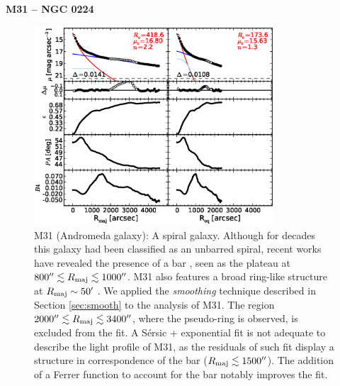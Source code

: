 \documentclass[preprint2]{emulateapj}
\newcommand{\fitfigurewidth}{0.8\textwidth}
\begin{document}
  \clearpage\newpage\noindent
  {\bf M31 -- NGC 0224 \\}

  \begin{figure}[h]
  \begin{center}
  \includegraphics[width=\fitfigurewidth]{m31_1Dfit.eps}
  \caption{M31 (Andromeda galaxy):
  A spiral galaxy. 
  Although for decades this galaxy had been classified as an unbarred spiral,
  recent works have revealed the presence of a bar \citep{athanassoulabeaton2006m31,beaton2007m31,morrison2011m31}, 
  seen as the plateau at $800'' \lesssim R_{\rm maj} \lesssim 1000''$.
  M31 also features a broad ring-like structure at $R_{\rm maj} \sim 50'$ \citep{athanassoulabeaton2006m31}. 
  We applied the \emph{smoothing} technique described in Section \ref{sec:smooth} to the analysis of M31.
  The region $2000'' \lesssim R_{\rm maj} \lesssim 3400''$, where the pseudo-ring is observed, is excluded from the fit.
  A S\'ersic + exponential fit is not adequate to describe the light profile of M31,
  as the residuals of such fit display a structure in correspondence of the bar ($R_{\rm maj} \lesssim 1500''$).
  The addition of a Ferrer function to account for the bar notably improves the fit.
  }
  \end{center}
  \end{figure}
\end{document}
